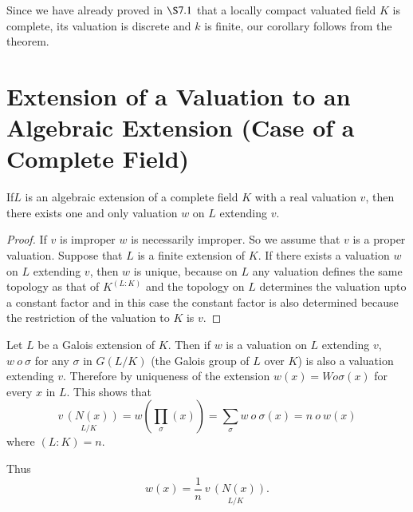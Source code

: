 Since we have already proved in $\S 7.1$ that a locally compact
valuated field $K$ is complete, its valuation is discrete and $k$ is
finite, our corollary follows from the theorem. 

\section[Extension of a Valuation to an Algebraic Extension..]{Extension of 
a Valuation to an Algebraic Extension  (Case of a Complete 
Field)}\label{part1:chap2:sec5} %

\setcounter{theorem}{0}
\begin{theorem}\label{part1:chap2:sec5:thm1}%
  If\pageoriginale $L$ is an algebraic extension of a complete field $K$ with a real
  valuation $v$, then there exists one and only valuation $w$ on $L$
  extending $v$. 
\end{theorem}

\begin{proof}
  If $v$ is improper $w$ is necessarily improper. So we assume that
  $v$ is a proper valuation. Suppose that $L$ is a finite extension
  of $K$. If there exists a valuation $w$ on $L$ extending $v$, then
  $w$ is unique, because on $L$ any valuation defines the same
  topology as that of $K^{(L:  K)}$ and the topology on $L$ determines
  the valuation upto a constant factor and in this case the constant
  factor is also determined because the restriction of the valuation
  to $K$ is $v$. 
\end{proof} 

Let $L$ be a Galois extension of $K$. Then if $w$ is a valuation on
$L$ extending $v$, $w ~o~ \sigma$ for any $\sigma$ in $G(L/K)$ (the
Galois group of $L$ over $K$) is also a valuation extending
$v$. Therefore by uniqueness of the extension $w(x) = W o \sigma (x)$
for every $x$ in $L$. This shows that  
$$
\underset{L/K}{v \,(N (x))}= w ( \prod\limits_\sigma (x)) =
\sum\limits_\sigma w~ o~\sigma(x) = n~o~w(x) 
$$
where $(L:  K) = n$.
  
Thus
\begin{equation*}
  w(x) = \frac{1}{n} ~\underset{L/K}{v\,(N
    (x))}.\tag{1}\label{part1:chap2:sec5:eq1} 
\end{equation*}

